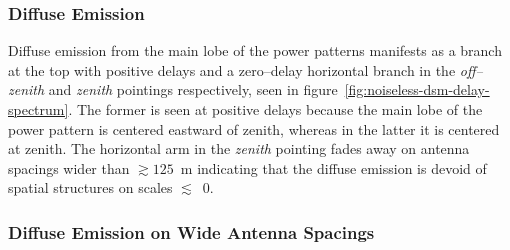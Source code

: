 \documentclass[preprint2,iop,numberedappendix]{emulateapj}
\begin{document}

\subsubsection{Diffuse Emission}\label{sec:diffuse-features}

Diffuse emission from the main lobe of the power patterns manifests as a branch at the top with positive delays and a zero--delay horizontal branch in the {\it off--zenith} and {\it zenith} pointings respectively, seen in figure~\ref{fig:noiseless-dsm-delay-spectrum}. The former is seen at positive delays because the main lobe of the power pattern is centered eastward of zenith, whereas in the latter it is centered at zenith. The horizontal arm in the {\it zenith} pointing fades away on antenna spacings wider than $\gtrsim 125$~m indicating that the diffuse emission is devoid of spatial structures on scales $\lesssim$~0. 

\subsubsection{Diffuse Emission on Wide Antenna Spacings}\label{sec:diffuse-long-baselines}
\end{document}
